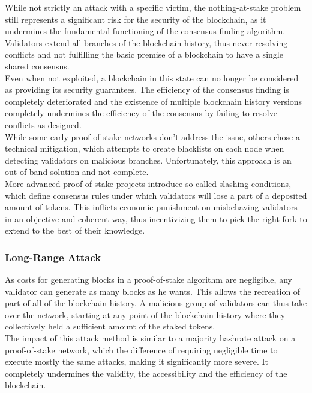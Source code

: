 \documentclass[12pt,a4paper]{article}
\begin{document}
While not strictly an attack with a specific victim, the nothing-at-stake problem still represents a significant risk for the security of the \gls{blockchain}, as it undermines the fundamental functioning of the consensus finding algorithm. Validators extend all branches of the blockchain history, thus never resolving conflicts and not fulfilling the basic premise of a \gls{blockchain} to have a single shared \gls{consensus}.\\

Even when not exploited, a \gls{blockchain} in this state can no longer be considered as providing its security guarantees. The efficiency of the consensus finding is completely deteriorated and the existence of multiple blockchain history versions completely undermines the efficiency of the consensus by failing to resolve conflicts as designed.\\

While some early proof-of-stake networks don't address the issue, others chose a technical mitigation, which attempts to create blacklists on each node when detecting validators on malicious branches. Unfortunately, this approach is an out-of-band solution and not complete.\\

More advanced proof-of-stake projects introduce so-called slashing conditions,  which define consensus rules under which validators will lose a part of a deposited amount of tokens. This inflicts economic punishment on misbehaving validators in an objective and coherent way, thus incentivizing them to pick the right fork to extend to the best of their knowledge.\\

\subsubsection{Long-Range Attack}

As costs for generating blocks in a proof-of-stake algorithm are negligible, any validator can generate as many blocks as he wants. This allows the recreation of part of all of the blockchain history. A malicious group of validators can thus take over the network, starting at any point of the blockchain history where they collectively held a sufficient amount of the staked tokens.\\

The impact of this attack method is similar to a majority \gls{hashrate} attack on a proof-of-stake network, which the difference of requiring negligible time to execute mostly the same attacks, making it significantly more severe. It completely undermines the validity, the accessibility and the efficiency of the \gls{blockchain}.\\
\end{document}

